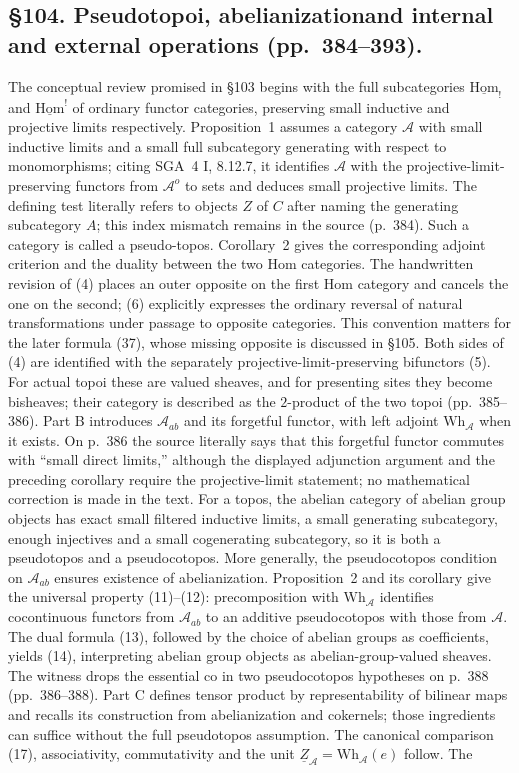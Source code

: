\documentclass[10pt,oneside]{book}
\begin{document}
\subsection*{\S104. Pseudotopoi, abelianization\newline and internal and external operations (pp.\ 384--393).}
The conceptual review promised in \S103 begins with the full subcategories $\underline{\mathrm{Hom}}_!$ and $\underline{\mathrm{Hom}}^!$ of ordinary functor categories, preserving small inductive and projective limits respectively. Proposition~1 assumes a category $\mathcal A$ with small inductive limits and a small full subcategory generating with respect to monomorphisms; citing SGA~4 I, 8.12.7, it identifies $\mathcal A$ with the projective-limit-preserving functors from $\mathcal A^o$ to sets and deduces small projective limits. The defining test literally refers to objects $Z$ of $C$ after naming the generating subcategory $A$; this index mismatch remains in the source (p.\ 384). Such a category is called a pseudo-topos. Corollary~2 gives the corresponding adjoint criterion and the duality between the two Hom categories. The handwritten revision of (4) places an outer opposite on the first Hom category and cancels the one on the second; (6) explicitly expresses the ordinary reversal of natural transformations under passage to opposite categories. This convention matters for the later formula (37), whose missing opposite is discussed in \S105. Both sides of (4) are identified with the separately projective-limit-preserving bifunctors (5). For actual topoi these are valued sheaves, and for presenting sites they become bisheaves; their category is described as the $2$-product of the two topoi (pp.\ 385--386). Part B introduces $\mathcal A_{ab}$ and its forgetful functor, with left adjoint $\mathrm{Wh}_{\mathcal A}$ when it exists. On p.\ 386 the source literally says that this forgetful functor commutes with ``small direct limits,'' although the displayed adjunction argument and the preceding corollary require the projective-limit statement; no mathematical correction is made in the text. For a topos, the abelian category of abelian group objects has exact small filtered inductive limits, a small generating subcategory, enough injectives and a small cogenerating subcategory, so it is both a pseudotopos and a pseudocotopos. More generally, the pseudocotopos condition on $\mathcal A_{ab}$ ensures existence of abelianization. Proposition~2 and its corollary give the universal property (11)--(12): precomposition with $\mathrm{Wh}_{\mathcal A}$ identifies cocontinuous functors from $\mathcal A_{ab}$ to an additive pseudocotopos with those from $\mathcal A$. The dual formula (13), followed by the choice of abelian groups as coefficients, yields (14), interpreting abelian group objects as abelian-group-valued sheaves. The witness drops the essential co in two pseudocotopos hypotheses on p.\ 388 (pp.\ 386--388). Part C defines tensor product by representability of bilinear maps and recalls its construction from abelianization and cokernels; those ingredients can suffice without the full pseudotopos assumption. The canonical comparison (17), associativity, commutativity and the unit $\underline Z_{\mathcal A}=\mathrm{Wh}_{\mathcal A}(e)$ follow. The 
\end{document}
